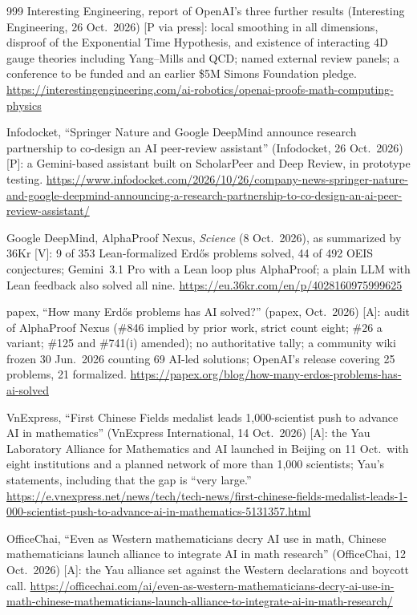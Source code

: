 \begin{thebibliography}{999}
 Interesting Engineering, report of OpenAI's three further results (Interesting Engineering, 26 Oct.\ 2026) [P via press]: local smoothing in all dimensions, disproof of the Exponential Time Hypothesis, and existence of interacting 4D gauge theories including Yang--Mills and QCD; named external review panels; a conference to be funded and an earlier \$5M Simons Foundation pledge. \url{https://interestingengineering.com/ai-robotics/openai-proofs-math-computing-physics}

 Infodocket, ``Springer Nature and Google DeepMind announce research partnership to co-design an AI peer-review assistant'' (Infodocket, 26 Oct.\ 2026) [P]: a Gemini-based assistant built on ScholarPeer and Deep Review, in prototype testing. \url{https://www.infodocket.com/2026/10/26/company-news-springer-nature-and-google-deepmind-announcing-a-research-partnership-to-co-design-an-ai-peer-review-assistant/}

 Google DeepMind, AlphaProof Nexus, \emph{Science} (8 Oct.\ 2026), as summarized by 36Kr [V]: 9 of 353 Lean-formalized Erd\H{o}s problems solved, 44 of 492 OEIS conjectures; Gemini~3.1 Pro with a Lean loop plus AlphaProof; a plain LLM with Lean feedback also solved all nine. \url{https://eu.36kr.com/en/p/4028160975999625}

 papex, ``How many Erd\H{o}s problems has AI solved?'' (papex, Oct.\ 2026) [A]: audit of AlphaProof Nexus (\#846 implied by prior work, strict count eight; \#26 a variant; \#125 and \#741(i) amended); no authoritative tally; a community wiki frozen 30 Jun.\ 2026 counting 69 AI-led solutions; OpenAI's release covering 25 problems, 21 formalized. \url{https://papex.org/blog/how-many-erdos-problems-has-ai-solved}

 VnExpress, ``First Chinese Fields medalist leads 1,000-scientist push to advance AI in mathematics'' (VnExpress International, 14 Oct.\ 2026) [A]: the Yau Laboratory Alliance for Mathematics and AI launched in Beijing on 11 Oct.\ with eight institutions and a planned network of more than 1,000 scientists; Yau's statements, including that the gap is ``very large.'' \url{https://e.vnexpress.net/news/tech/tech-news/first-chinese-fields-medalist-leads-1-000-scientist-push-to-advance-ai-in-mathematics-5131357.html}

 OfficeChai, ``Even as Western mathematicians decry AI use in math, Chinese mathematicians launch alliance to integrate AI in math research'' (OfficeChai, 12 Oct.\ 2026) [A]: the Yau alliance set against the Western declarations and boycott call. \url{https://officechai.com/ai/even-as-western-mathematicians-decry-ai-use-in-math-chinese-mathematicians-launch-alliance-to-integrate-ai-in-math-research/}


\end{thebibliography}
